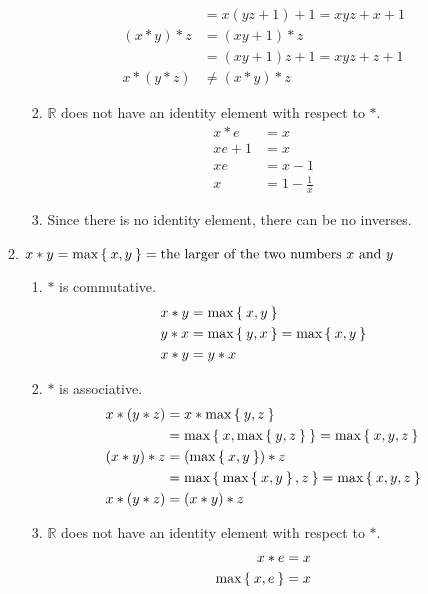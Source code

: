 \begin{enumerate}[label={\Alph*.},font={\bfseries}]
\begin{enumerate}[label={\arabic*},font={\bfseries}]
\begin{enumerate}[label={(\roman*)}]
\begin{align*}
              &= x(yz+1)+1 = xyz+x +1 \\
              (x*y)*z &= (xy+1)*z \\
              &= (xy+1)z+1 = xyz+z+1 \\
              x*(y*z) &\neq (x*y)*z
            \end{align*}
          \item $\mathbb{R}$ does not have an identity element with respect to $*$.
            \begin{align*}
              x*e &= x \\
              xe+1 &= x \\
              xe &= x-1 \\
              x &= 1-\frac{1}{x}
            \end{align*}
          \item Since there is no identity element, there can be no inverses.
        \end{enumerate}
      \item $x*y=\text{max}\Set{x,y}=\text{the larger of the two numbers $x$ and $y$}$
        \begin{enumerate}[label={(\roman*)}]
          \item $*$ is commutative.
            \begin{align*}
              x*y &= \text{max}\Set{x,y} \\
              y*x &= \text{max}\Set{y,x} = \text{max}\Set{x,y} \\
              x*y &= y*x
            \end{align*}
          \item $*$ is associative.
            \begin{align*}
              x*(y*z) &= x*\text{max}\Set{y,z} \\
              &= \text{max}\Set{x,\text{max}\Set{y,z}} = \text{max}\Set{x,y,z} \\
              (x*y)*z &= (\text{max}\Set{x,y})*z \\
              &= \text{max}\Set{\text{max}\Set{x,y},z} = \text{max}\Set{x,y,z} \\
              x*(y*z) &= (x*y)*z
            \end{align*}
          \item $\mathbb{R}$ does not have an identity element with respect to $*$.
            \begin{align*}
              x*e &= x \\
              \text{max}\Set{x,e} &= x \\

\end{align*}
\end{enumerate}
\end{enumerate}
\end{enumerate}
